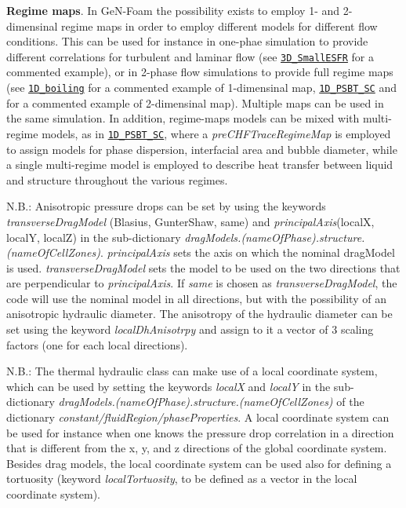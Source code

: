  {\bfseries Regime maps}. In Ge\+N-\/\+Foam the possibility exists to employ 1-\/ and 2-\/dimensinal regime maps in order to employ different models for different flow conditions. This can be used for instance in one-\/phae simulation to provide different correlations for turbulent and laminar flow (see \href{https://gitlab.com/foam-for-nuclear/GeN-Foam/-/blob/master/Tutorials/3D_SmallESFR/rootCase/constant/fluidRegion/phaseProperties}{\tt 3\+D\+\_\+\+Small\+E\+S\+FR} for a commented example), or in 2-\/phase flow simulations to provide full regime maps (see \href{https://gitlab.com/foam-for-nuclear/GeN-Foam/-/blob/master/Tutorials/1D_boiling/constant/fluidRegion/phaseProperties}{\tt 1\+D\+\_\+boiling} for a commented example of 1-\/dimensinal map, \href{https://gitlab.com/foam-for-nuclear/GeN-Foam/-/blob/master/Tutorials/1D_PSBT_SC/constant/fluidRegion/phaseProperties}{\tt 1\+D\+\_\+\+P\+S\+B\+T\+\_\+\+SC} and for a commented example of 2-\/dimensinal map). Multiple maps can be used in the same simulation. In addition, regime-\/maps models can be mixed with multi-\/regime models, as in \href{https://gitlab.com/foam-for-nuclear/GeN-Foam/-/blob/master/Tutorials/1D_PSBT_SC/constant/fluidRegion/phaseProperties}{\tt 1\+D\+\_\+\+P\+S\+B\+T\+\_\+\+SC}, where a {\itshape pre\+C\+H\+F\+Trace\+Regime\+Map} is employed to assign models for phase dispersion, interfacial area and bubble diameter, while a single multi-\/regime model is employed to describe heat transfer between liquid and structure throughout the various regimes. 

 N.\+B.\+: Anisotropic pressure drops can be set by using the keywords {\itshape transverse\+Drag\+Model} (Blasius, Gunter\+Shaw, same) and {\itshape principal\+Axis}(localX, localY, localZ) in the sub-\/dictionary {\itshape drag\+Models.(name\+Of\+Phase).structure.(name\+Of\+Cell\+Zones)}. {\itshape principal\+Axis} sets the axis on which the nominal drag\+Model is used. {\itshape transverse\+Drag\+Model} sets the model to be used on the two directions that are perpendicular to {\itshape principal\+Axis}. If {\itshape same} is chosen as {\itshape transverse\+Drag\+Model}, the code will use the nominal model in all directions, but with the possibility of an anisotropic hydraulic diameter. The anisotropy of the hydraulic diameter can be set using the keyword {\itshape local\+Dh\+Anisotrpy} and assign to it a vector of 3 scaling factors (one for each local directions). 

 N.\+B.\+: The thermal hydraulic class can make use of a local coordinate system, which can be used by setting the keywords {\itshape localX} and {\itshape localY} in the sub-\/dictionary {\itshape drag\+Models.(name\+Of\+Phase).structure.(name\+Of\+Cell\+Zones)} of the dictionary {\itshape constant/fluid\+Region/phase\+Properties}. A local coordinate system can be used for instance when one knows the pressure drop correlation in a direction that is different from the x, y, and z directions of the global coordinate system. Besides drag models, the local coordinate system can be used also for defining a tortuosity (keyword {\itshape local\+Tortuosity}, to be defined as a vector in the local coordinate system).  ~\newline


